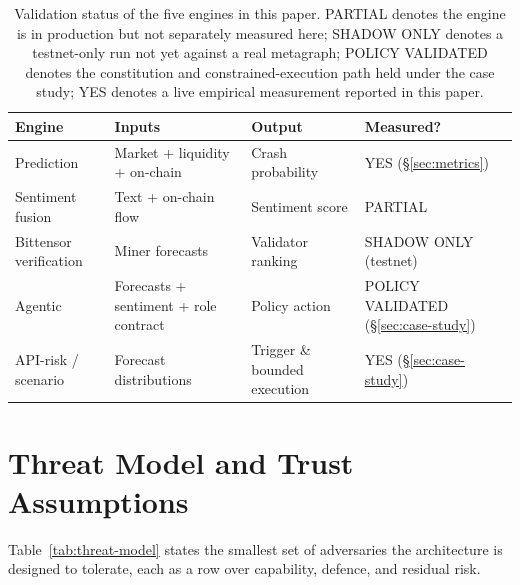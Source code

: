 \documentclass[11pt,a4paper]{article}
\begin{document}
\begin{table}[ht]
\centering
\small
\caption{Validation status of the five engines in this paper. PARTIAL
denotes the engine is in production but not separately measured here;
SHADOW ONLY denotes a testnet-only run not yet against a real metagraph;
POLICY VALIDATED denotes the constitution and constrained-execution path
held under the case study; YES denotes a live empirical measurement
reported in this paper.}
\label{tab:validation-status}
\begin{tabularx}{\linewidth}{@{}l Y Y l@{}}
\toprule
\textbf{Engine} & \textbf{Inputs} & \textbf{Output} & \textbf{Measured?} \\
\midrule
Prediction & Market + liquidity + on-chain & Crash probability &
YES (\S\ref{sec:metrics}) \\
Sentiment fusion & Text + on-chain flow & Sentiment score & PARTIAL \\
Bittensor verification & Miner forecasts & Validator ranking &
SHADOW ONLY (testnet) \\
Agentic & Forecasts + sentiment + role contract & Policy action &
POLICY VALIDATED (\S\ref{sec:case-study}) \\
API-risk / scenario & Forecast distributions & Trigger \& bounded execution &
YES (\S\ref{sec:case-study}) \\
\bottomrule
\end{tabularx}
\end{table}

\section{Threat Model and Trust Assumptions}\label{sec:threat}

Table~\ref{tab:threat-model} states the smallest set of adversaries the
architecture is designed to tolerate, each as a row over capability,
defence, and residual risk.
\end{document}
